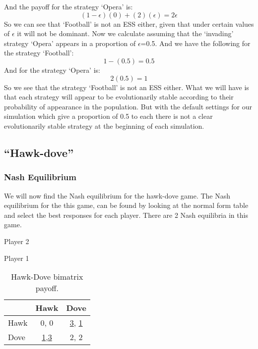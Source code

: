 \documentclass{book}
\begin{document}
And the payoff for the strategy `Opera' is:
\begin{equation}
(1-{\epsilon})(0) + (2)({\epsilon}) =  2{\epsilon}
\end{equation}
So we can see that `Football' is not an ESS either, given that under certain values of $\epsilon$ it will not be dominant. Now we calculate assuming that the `invading' strategy `Opera' appears in a proportion of $\epsilon$=0.5. And we have the following for the strategy `Football':
\begin{equation}
1 -  (0.5) = 0.5
\end{equation}
And for the strategy `Opera' is:
\begin{equation}
 2(0.5)  = 1
\end{equation}
So we see that the strategy `Football' is not an ESS either. What we will have is that each strategy will appear to be evolutionarily stable according to their probability of appearance in the population. But with the default settings for our simulation which give a proportion of 0.5 to each there is not a clear evolutionarily stable strategy at the beginning of each simulation.


\subsection{``Hawk-dove''}


\subsubsection{Nash Equilibrium}
We will now find the Nash equilibrium for the hawk-dove game. The Nash equilibrium for the this game,  can be found by looking at the normal form table and select the best responses for each player. There are 2 Nash equilibria in this game.

\begin{table}[H]
\begin{center}
Player 2

Player 1
\begin{tabular}{|l|c|c|}
\hline
 & Hawk & Dove\\ 
\hline
Hawk & 0, 0 & \underline{3}, \underline{1}\\
\hline
Dove & \underline{1},\underline{3} & 2, 2\\
\hline
\end{tabular}

\caption{ Hawk-Dove bimatrix payoff.}
\label{fig:mpnashhd}	
\end{center}
\end{table}
\end{document}
